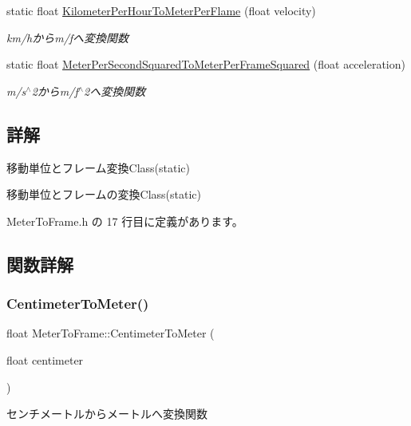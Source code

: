 \begin{DoxyCompactItemize}
static float \mbox{\hyperlink{class_meter_to_frame_aa041cc9bc0f37cced44f98d66807a2b4}{Kilometer\+Per\+Hour\+To\+Meter\+Per\+Flame}} (float velocity)
\begin{DoxyCompactList}\small\item\em km/hからm/fへ変換関数 \end{DoxyCompactList}\item 
static float \mbox{\hyperlink{class_meter_to_frame_ac3292be31b35e97027a65b4c74763ebe}{Meter\+Per\+Second\+Squared\+To\+Meter\+Per\+Frame\+Squared}} (float acceleration)
\begin{DoxyCompactList}\small\item\em m/s$^\wedge$2からm/f$^\wedge$2へ変換関数 \end{DoxyCompactList}\end{DoxyCompactItemize}


\subsection{詳解}
移動単位とフレーム変換\+Class(static) 

移動単位とフレームの変換\+Class(static) 

 Meter\+To\+Frame.\+h の 17 行目に定義があります。



\subsection{関数詳解}
\mbox{\label{class_meter_to_frame_aade64981cce2a79058fc6f0f3d9a9d21}} 
\subsubsection{\texorpdfstring{Centimeter\+To\+Meter()}{CentimeterToMeter()}}
{\footnotesize\ttfamily float Meter\+To\+Frame\+::\+Centimeter\+To\+Meter (\begin{DoxyParamCaption}\item[{float}]{centimeter }\end{DoxyParamCaption})\hspace{0.3cm}{\ttfamily [static]}}



センチメートルからメートルへ変換関数 


